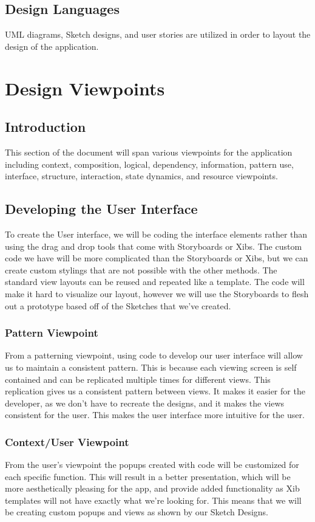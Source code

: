 \documentclass[letterpaper,10pt,titlepage]{article}
\begin{document}
\subsection{Design Languages}
UML diagrams, Sketch designs, and user stories are utilized in order to layout the design of the application.

\section{Design Viewpoints}

\subsection{Introduction}
This section of the document will span various viewpoints for the application including context, composition, logical, dependency, information, pattern use, interface, structure, interaction, state dynamics, and resource viewpoints.



\subsection{Developing the User Interface}
To create the User interface, we will be coding the interface elements rather than using the drag and drop tools that come with Storyboards or Xibs. The custom code we have will be more complicated than the Storyboards or Xibs, but we can create custom stylings that are not possible with the other methods. The standard view layouts can be reused and repeated like a template. The code will make it hard to visualize our layout, however we will use the Storyboards to flesh out a prototype based off of the Sketches that we’ve created.

\subsubsection{Pattern Viewpoint}
From a patterning viewpoint, using code to develop our user interface will allow us to maintain a consistent pattern. This is because each viewing screen is self contained and can be replicated multiple times for different views. This replication gives us a consistent pattern between views. It makes it easier for the developer, as we don’t have to recreate the designs, and it makes the views consistent for the user. This makes the user interface more intuitive for the user.

\subsubsection{Context/User Viewpoint}
From the user’s viewpoint the popups created with code will be customized for each specific function. This will result in a better presentation, which will be more aesthetically pleasing for the app, and provide added functionality as Xib templates will not have exactly what we’re looking for. This means that we will be creating custom popups and views as shown by our Sketch Designs.
\end{document}
